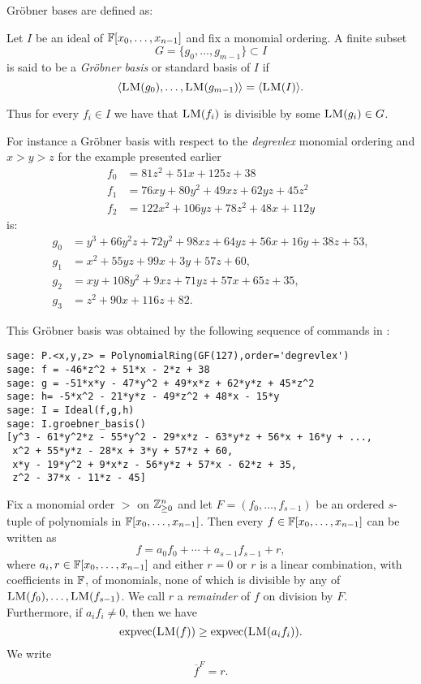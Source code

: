 Gröbner bases are defined as:
\begin{definition}
Let $I$ be an ideal of $\mathbb{F}[x_0,\dots,x_{n-1}]$ and fix a monomial ordering. A finite subset $$G = \{g_0 ,\dots , g_{m-1} \} \subset I$$  is said to be a \emph{Gröbner basis} or standard basis of $I$ if
\[
\langle \textsc{LM}(g_0 ), \dots , \textsc{LM}(g_{m-1})\rangle = \langle \textsc{LM}(I) \rangle.
\]
\end{definition}

Thus for every $f_i \in I$ we have that $\textsc{LM}(f_i)$ is divisible by some $\textsc{LM}(g_i) \in G$.

\begin{example}
For instance a Gröbner basis with respect to the \emph{degrevlex} monomial ordering and $x > y > z$ for the example presented earlier
\begin{align*}
f_0 &= 81 z^{2} + 51 x + 125 z + 38\\
f_1 &= 76 x y + 80 y^{2} + 49 x z + 62 y z + 45 z^{2}\\
f_2 &= 122 x^{2} + 106 y z + 78 z^{2} + 48 x + 112 y
\end{align*}
is:
\begin{align*}
g_0 &= y^{3} + 66 y^{2} z + 72 y^{2} + 98 x z + 64 y z + 56 x + 16 y + 38 z + 53,\\
g_1 &= x^{2} + 55 y z + 99 x + 3 y + 57 z + 60,\\
g_2 &=x y + 108 y^{2} + 9 x z + 71 y z + 57 x + 65 z + 35,\\
g_3 &=z^{2} + 90 x + 116 z + 82.
\end{align*}
\end{example}

This Gröbner basis was obtained by the following sequence of commands in \Sage:

\begin{lstlisting}
sage: P.<x,y,z> = PolynomialRing(GF(127),order='degrevlex')
sage: f = -46*z^2 + 51*x - 2*z + 38
sage: g = -51*x*y - 47*y^2 + 49*x*z + 62*y*z + 45*z^2
sage: h= -5*x^2 - 21*y*z - 49*z^2 + 48*x - 15*y
sage: I = Ideal(f,g,h)
sage: I.groebner_basis()
[y^3 - 61*y^2*z - 55*y^2 - 29*x*z - 63*y*z + 56*x + 16*y + ..., 
 x^2 + 55*y*z - 28*x + 3*y + 57*z + 60, 
 x*y - 19*y^2 + 9*x*z - 56*y*z + 57*x - 62*z + 35, 
 z^2 - 37*x - 11*z - 45]
\end{lstlisting}

\begin{definition}
Fix a monomial order $>$ on $\mathbb{Z}_{\geq 0}^n$ and let $F = (f_0, \dots,f_{s-1})$ be an ordered $s$-tuple of polynomials in $\mathbb{F}[x_0,\dots,x_{n-1}]$. Then every $f \in \mathbb{F}[x_0,\dots,x_{n-1}]$ can be written as \[ f = a_0f_0 + \cdots + a_{s-1}f_{s-1} + r,\] where $a_i,r \in \mathbb{F}[x_0,\dots,x_{n-1}]$ and either $r=0$ or $r$ is a linear combination, with coefficients in $\mathbb{F}$, of monomials, none of which is divisible by any of $\textsc{LM}(f_0),\dots,\textsc{LM}(f_{s-1})$. We call $r$ a \emph{remainder} of $f$ on division by $F$. Furthermore, if $a_if_i \neq 0$, then we have \[\textnormal{expvec}(\textsc{LM}(f)) \geq \textnormal{expvec}(\textsc{LM}(a_if_i)).\] We write
\[\overline{f}^F = r.\]
\end{definition}

